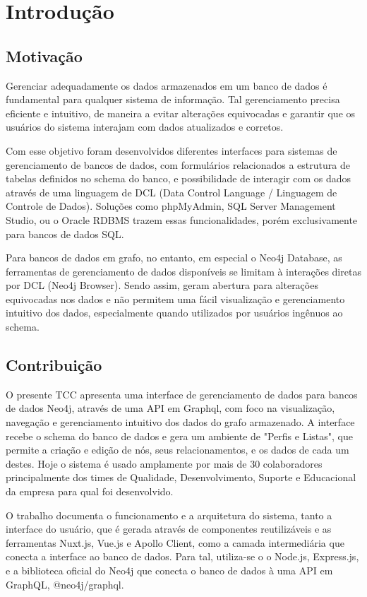 \chapter{Introdução}

\section{Motivação}

Gerenciar adequadamente os dados armazenados em um banco de dados é fundamental para qualquer sistema de informação. Tal gerenciamento precisa eficiente e intuitivo, de maneira a evitar alterações equivocadas e garantir que os usuários do sistema interajam com dados atualizados e corretos.

Com esse objetivo foram desenvolvidos diferentes interfaces para sistemas de gerenciamento de bancos de dados, com formulários relacionados {a} estrutura de tabelas definidos no schema do banco, e possibilidade de interagir com os dados através de uma linguagem de DCL (Data Control Language / Linguagem de Controle de Dados). Soluções como phpMyAdmin, SQL Server Management Studio, ou o Oracle RDBMS trazem essas funcionalidades, porém exclusivamente para bancos de dados SQL.

Para bancos de dados em grafo, no entanto, em especial o Neo4j Database, as ferramentas de gerenciamento de dados disponíveis se limitam à interações diretas por DCL (Neo4j Browser). Sendo assim, geram abertura para alterações equivocadas nos dados e não permitem uma fácil visualização e gerenciamento intuitivo dos dados, especialmente quando utilizados por usuários ingênuos ao schema.

\section{Contribuição}

O presente TCC apresenta uma interface de gerenciamento de dados para bancos de dados Neo4j, através de uma API em Graphql, com foco na visualização, navegação e gerenciamento intuitivo dos dados do grafo armazenado. A interface recebe o schema do banco de dados e gera um ambiente de "Perfis e Listas", que permite a criação e edição de nós, seus relacionamentos, e os dados de cada um destes. Hoje o sistema é usado amplamente por mais de 30 colaboradores principalmente dos times de Qualidade, Desenvolvimento, Suporte e Educacional da empresa para qual foi desenvolvido.

O trabalho documenta o funcionamento e a arquitetura do sistema, tanto a interface do usuário, que é gerada através de componentes reutilizáveis e as ferramentas Nuxt.js, Vue.js e Apollo Client, como a camada intermediária que conecta a interface ao banco de dados. Para tal, utiliza-se o o Node.js, Express.js, e a biblioteca oficial do Neo4j que conecta o banco de dados à uma API em GraphQL, @neo4j/graphql.

